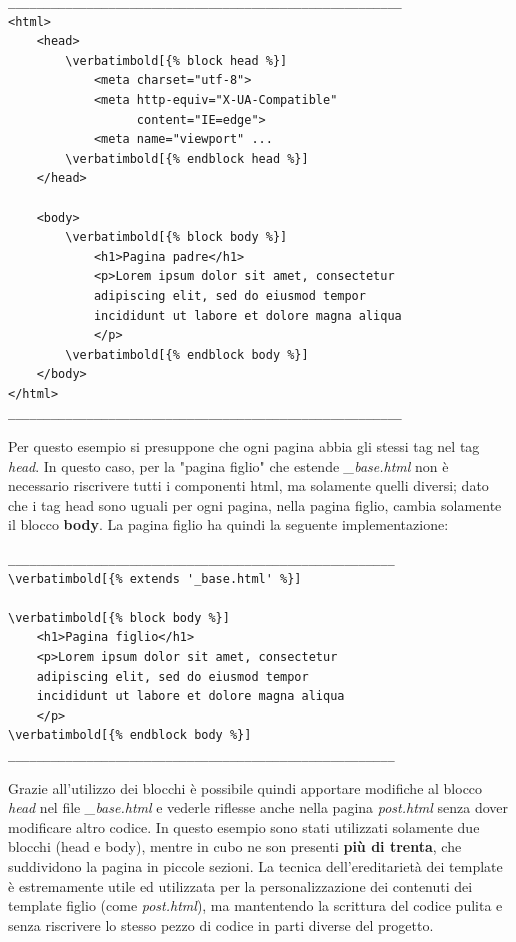 \documentclass[12pt,a4paper]{article}
\newcommand\verbatimbold[1]{\textbf{#1}}
\begin{document}
\begin{Verbatim}[commandchars=\\\[\]]
_______________________________________________________
<html>
    <head>
        \verbatimbold[{% block head %}]
            <meta charset="utf-8">
            <meta http-equiv="X-UA-Compatible"
                  content="IE=edge">
            <meta name="viewport" ...
        \verbatimbold[{% endblock head %}]
    </head>

    <body>
        \verbatimbold[{% block body %}]
            <h1>Pagina padre</h1>
            <p>Lorem ipsum dolor sit amet, consectetur
            adipiscing elit, sed do eiusmod tempor
            incididunt ut labore et dolore magna aliqua
            </p>
        \verbatimbold[{% endblock body %}]
    </body>
</html>
_______________________________________________________
\end{Verbatim}
Per questo esempio si presuppone che ogni pagina abbia gli stessi tag nel tag \textit{head}.
In questo caso, per la "pagina figlio" che estende \textit{\_base.html} non è necessario riscrivere tutti i componenti html, ma solamente quelli diversi; dato che i tag head sono uguali per ogni pagina, nella pagina figlio, cambia solamente il blocco \textbf{body}. La pagina figlio ha quindi la seguente implementazione:

\begin{Verbatim}[commandchars=\\\[\]]
______________________________________________________
\verbatimbold[{% extends '_base.html' %}]

\verbatimbold[{% block body %}]
    <h1>Pagina figlio</h1>
    <p>Lorem ipsum dolor sit amet, consectetur
    adipiscing elit, sed do eiusmod tempor
    incididunt ut labore et dolore magna aliqua
    </p>
\verbatimbold[{% endblock body %}]
______________________________________________________
\end{Verbatim}
Grazie all'utilizzo dei blocchi è possibile quindi apportare modifiche al blocco \textit{head} nel file \textit{\_base.html} e vederle riflesse anche nella pagina \textit{post.html} senza dover modificare altro codice.
In questo esempio sono stati utilizzati solamente due blocchi (head e body), mentre in cubo ne son presenti \textbf{più di trenta}, che suddividono la pagina in piccole sezioni. La tecnica dell'ereditarietà dei template è estremamente utile ed utilizzata per la personalizzazione dei contenuti dei template figlio (come \textit{post.html}), ma mantentendo la scrittura del codice pulita e senza riscrivere lo stesso pezzo di codice in parti diverse del progetto.
\end{document}
